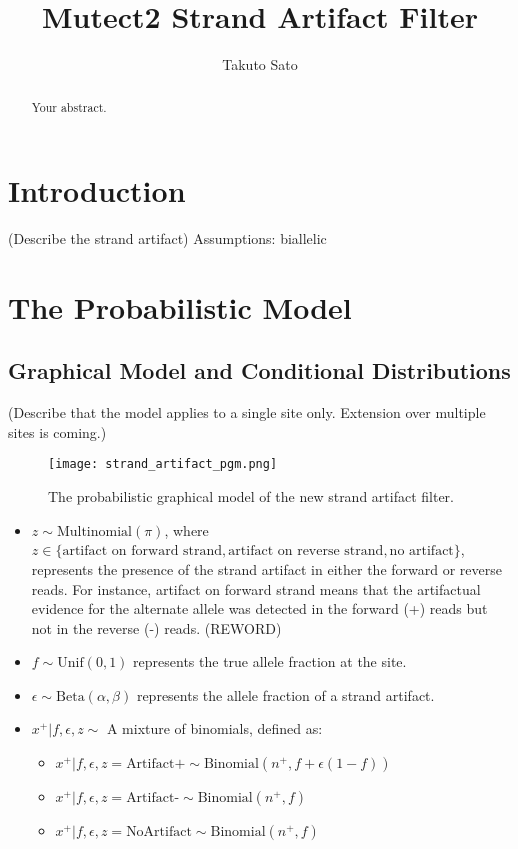 \documentclass[a4paper]{article}
\title{Mutect2 Strand Artifact Filter}
\author{Takuto Sato}
\begin{document}
\maketitle

\begin{abstract}
Your abstract.
\end{abstract}

\section{Introduction}

(Describe the strand artifact)
Assumptions: 
biallelic

\section{The Probabilistic Model}
\subsection{Graphical Model and Conditional Distributions}

(Describe that the model applies to a single site only. Extension over multiple sites is coming.)

\begin{figure}
\centering
\texttt{[image: strand\_artifact\_pgm.png]}
\caption{\label{fig:frog}The probabilistic graphical model of the new strand artifact filter.}
\end{figure}

\begin{itemize}
	\item $z \sim \text{Multinomial}(\pi)$, where $z  \in \{ \text{artifact on forward strand}, \text{artifact on reverse strand}, \text{no artifact} \}$, represents the presence of the strand artifact in either the forward or reverse reads. For instance, artifact on forward strand means that the artifactual evidence for the alternate allele was detected in the forward (+) reads but not in the reverse (-) reads. (REWORD)
	\item $f \sim \text{Unif}(0, 1)$ represents the true allele fraction at the site.
	\item $\epsilon \sim \text{Beta}(\alpha, \beta)$ represents the allele fraction of a strand artifact.
	\item $x^+ | f, \epsilon, z \sim$ A mixture of binomials, defined as:
		\begin{itemize}
			\item $x^+ | f, \epsilon, z = \text{Artifact+} \sim \text{Binomial} (n^+, f + \epsilon(1-f))$
			\item $x^+ | f, \epsilon, z = \text{Artifact-} \sim \text{Binomial} (n^+, f)$
			\item $x^+ | f, \epsilon, z = \text{NoArtifact} \sim \text{Binomial} (n^+, f)$
		\end{itemize}			
\end{itemize}
\end{document}
